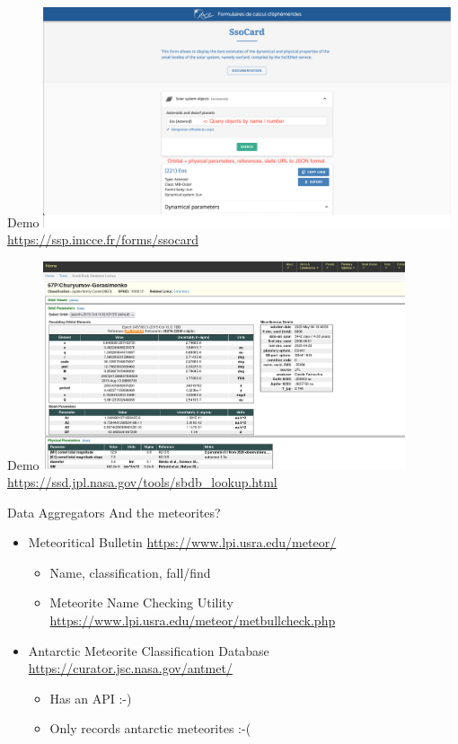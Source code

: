 \begin{frame}[t]{Demo}
  \includegraphics[width=0.9\textwidth]{gfx/demo_ssocard.png}
  \url{https://ssp.imcce.fr/forms/ssocard}
\end{frame}

\begin{frame}[t]{Demo}
  \includegraphics[width=0.8\textwidth]{gfx/demo_jpl.png}
  \url{https://ssd.jpl.nasa.gov/tools/sbdb_lookup.html}
\end{frame}

\begin{frame}[t]{Data Aggregators}
    And the meteorites?
    \smallskip
    \begin{itemize}
      \item Meteoritical Bulletin {\tiny\url{https://www.lpi.usra.edu/meteor/}}
        \begin{itemize}
          \item Name, classification, fall/find
          \item Meteorite Name Checking Utility {\tiny\url{https://www.lpi.usra.edu/meteor/metbullcheck.php}}
        \end{itemize}
        \vspace{0.5em}
      \item Antarctic Meteorite Classification Database {\tiny\url{https://curator.jsc.nasa.gov/antmet/}}
        \begin{itemize}
          \item[\circ] Has an API :-)
          \item[\circ] Only records antarctic meteorites :-(
        \end{itemize}
    \end{itemize}

\end{frame}

